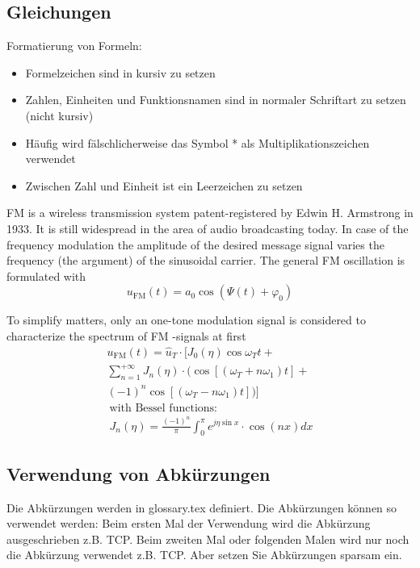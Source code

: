 \documentclass[conference]{IEEEtran}
\begin{document}
\subsection{Gleichungen}
Formatierung von Formeln:

\begin{itemize}
  \item Formelzeichen sind in kursiv zu setzen
  \item Zahlen, Einheiten und Funktionsnamen sind in normaler Schriftart zu setzen (nicht kursiv)
  \item Häufig wird fälschlicherweise das Symbol * als Multiplikationszeichen verwendet
  \item Zwischen Zahl und Einheit ist ein Leerzeichen zu setzen
\end{itemize}

\gls{FM} is a wireless transmission system patent-registered by Edwin H. Armstrong in 1933. It is still widespread in the area of audio broadcasting today. In case of the frequency modulation the amplitude of the desired message signal varies the frequency (the argument) of the sinusoidal carrier. The general \gls{FM} oscillation is formulated with 
\begin{equation}
u_{\textrm{FM}}(t)= a_0 \cos(\Psi(t)+\varphi_0) 
\label{eqn:fmosc}
\end{equation}

To simplify matters, only an one-tone modulation signal is considered to characterize the spectrum of \gls{FM} -signals at first
\begin{multline}
u_{\textrm{FM}}(t)=\hat u_T \cdot [J_0(\eta)\cos\omega_Tt +
\\ \sum_{n=1}^{+\infty} J_n(\eta) \cdot (\cos[(\omega_T+n\omega_1)t]+
\\(-1)^n \cos[(\omega_T-n\omega_1)t])] 
\\ \ \mbox{with Bessel functions:} 
\\ \ J_n(\eta)= \frac{(-1)^n}{\pi} \int_0^{\pi} e^{j\eta\sin x} \cdot \cos(nx) dx 
\end{multline}

\subsection{Verwendung von Abkürzungen}
Die Abkürzungen werden in glossary.tex definiert. Die Abkürzungen können so verwendet werden:
Beim ersten Mal der Verwendung wird die Abkürzung ausgeschrieben z.B. \gls{TCP}. Beim zweiten Mal oder folgenden Malen wird nur noch die Abkürzung verwendet z.B. \gls{TCP}.
Aber setzen Sie Abkürzungen sparsam ein.
\end{document}
